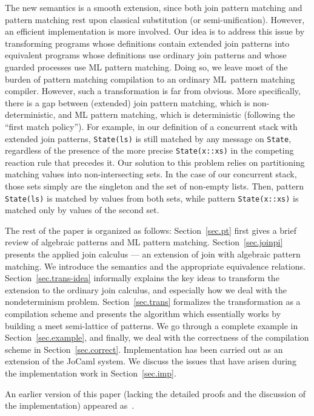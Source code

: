 \documentclass{LMCS}
\let \lst \lstinline
\newcommand{\jocaml}{\textrm{JoCaml}\xspace}
\renewcommand{\_}{\mathord{\rule[-.25ex]{1ex}{.15ex}}}
\begin{document}
The new semantics is a smooth extension, since both join pattern
matching and pattern matching rest upon classical substitution (or
semi-unification).  However, an efficient implementation is more
involved. Our idea is to address this issue by transforming programs
whose definitions contain extended join patterns into equivalent
programs whose definitions use ordinary join patterns and whose
guarded processes use ML pattern matching. Doing so, we leave most of
the burden of pattern matching compilation to an ordinary ML~pattern
matching compiler. However, such a transformation is far from obvious.
More specifically, there is a gap between (extended) join pattern
matching, which is non-deterministic, and ML pattern matching, which
is deterministic (following the ``first match policy''). For example,
in our definition of a concurrent stack with extended join patterns,
\lst"State(ls)" is still matched by any message on \lst"State",
regardless of the presence of the more precise \lst"State(x::xs)" in
the competing reaction rule that precedes it.  Our solution to this
problem relies on partitioning matching values into non-intersecting
sets.  In the case of our concurrent stack, those sets simply are the
singleton  and the set of non-empty lists.  Then,
pattern \lst"State(ls)" is matched by values from both sets, while
pattern \lst"State(x::xs)" is matched only by values of the second
set.

The rest of the paper is organized as follows: Section~\ref{sec.pt}
first gives a brief review of algebraic patterns and ML pattern
matching. Section~\ref{sec.joinpi} presents the applied join calculus
--- an extension of join with algebraic pattern matching.
We introduce the semantics and the appropriate equivalence relations.
Section~\ref{sec.trans-idea} informally explains the key ideas to
transform the extension to the ordinary join calculus, and especially how
we deal with the nondeterminism problem.
Section~\ref{sec.trans} formalizes the transformation as a
compilation scheme and presents the algorithm which essentially works
by building a meet semi-lattice of patterns.  We go through a complete
example in Section~\ref{sec.example}, and finally, we deal with the
correctness of the compilation scheme in Section~\ref{sec.correct}.
Implementation has been carried out as an extension of the \jocaml system.
We discuss the issues that have arisen during the
implementation work in Section~\ref{sec.imp}.

An earlier version of this paper (lacking the detailed proofs and the
discussion of the implementation) appeared
as~\cite{MaMaranget2004pattern}.
\end{document}
